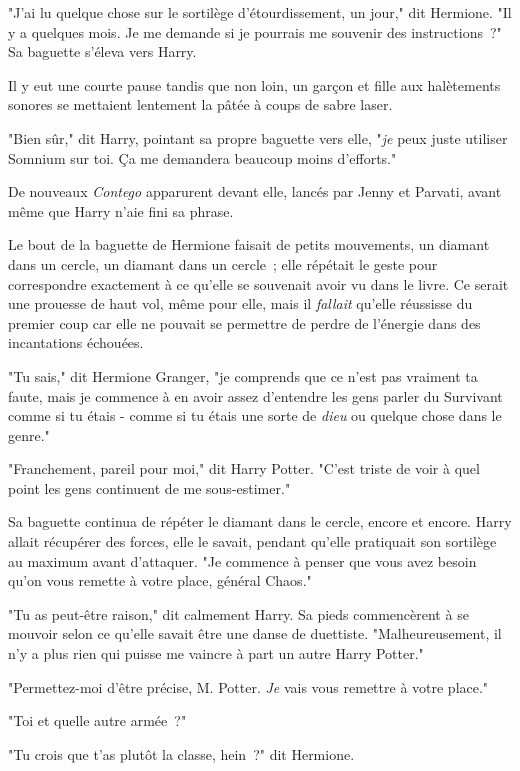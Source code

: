 "J'ai lu quelque chose sur le sortilège d'étourdissement, un jour," dit Hermione. "Il y a quelques mois. Je me demande si je pourrais me souvenir des instructions~?" Sa baguette s'éleva vers Harry.

Il y eut une courte pause tandis que non loin, un garçon et fille aux halètements sonores se mettaient lentement la pâtée à coups de sabre laser.

"Bien sûr," dit Harry, pointant sa propre baguette vers elle, "\emph{je} peux juste utiliser Somnium sur toi. Ça me demandera beaucoup moins d'efforts."

De nouveaux \emph{Contego} apparurent devant elle, lancés par Jenny et Parvati, avant même que Harry n'aie fini sa phrase.

Le bout de la baguette de Hermione faisait de petits mouvements, un diamant dans un cercle, un diamant dans un cercle~; elle répétait le geste pour correspondre exactement à ce qu'elle se souvenait avoir vu dans le livre. Ce serait une prouesse de haut vol, même pour elle, mais il \emph{fallait} qu'elle réussisse du premier coup car elle ne pouvait se permettre de perdre de l'énergie dans des incantations échouées.

"Tu sais," dit Hermione Granger, "je comprends que ce n'est pas vraiment ta faute, mais je commence à en avoir assez d'entendre les gens parler du Survivant comme si tu étais - comme si tu étais une sorte de \emph{dieu} ou quelque chose dans le genre."

"Franchement, pareil pour moi," dit Harry Potter. "C'est triste de voir à quel point les gens continuent de me sous-estimer."

Sa baguette continua de répéter le diamant dans le cercle, encore et encore. Harry allait récupérer des forces, elle le savait, pendant qu'elle pratiquait son sortilège au maximum avant d'attaquer. "Je commence à penser que vous avez besoin qu'on vous remette à votre place, général Chaos."

"Tu as peut-être raison," dit calmement Harry. Sa pieds commencèrent à se mouvoir selon ce qu'elle savait être une danse de duettiste. "Malheureusement, il n'y a plus rien qui puisse me vaincre à part un autre Harry Potter."

"Permettez-moi d'être précise, M. Potter. \emph{Je} vais vous remettre à votre place."

"Toi et quelle autre armée~?"

"Tu crois que t'as plutôt la classe, hein~?" dit Hermione.

